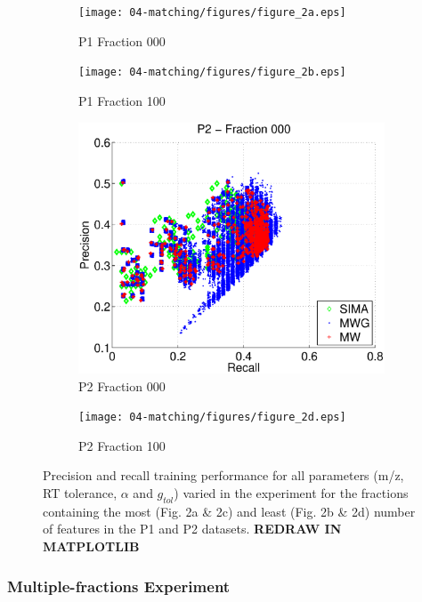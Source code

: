 \begin{figure}[!htbp]
\centering
   \begin{subfigure}{0.24\linewidth} \centering
     \texttt{[image: 04-matching/figures/figure\_2a.eps]}
     \caption{P1 Fraction 000}\label{fig:figA}
   \end{subfigure}
   \begin{subfigure}{0.24\linewidth} \centering
     \texttt{[image: 04-matching/figures/figure\_2b.eps]}
     \caption{P1 Fraction 100}\label{fig:figB}
   \end{subfigure}
   \begin{subfigure}{0.24\linewidth} \centering
     \includegraphics[scale=0.2]{04-matching/figures/figure_2c.eps}
     \caption{P2 Fraction 000}\label{fig:figC}
   \end{subfigure}
   \begin{subfigure}{0.24\linewidth} \centering
     \texttt{[image: 04-matching/figures/figure\_2d.eps]}
     \caption{P2 Fraction 100}\label{fig:figD}
   \end{subfigure}
\caption{Precision and recall training performance for all parameters (m/z, RT tolerance, $\alpha$ and $g_{tol}$) varied in the experiment for the fractions containing the most (Fig. 2a \& 2c) and least (Fig. 2b \& 2d) number of features in the P1 and P2 datasets. \textbf{REDRAW IN MATPLOTLIB}} \label{fig:single-fraction-results}
\end{figure}

\subsubsection{Multiple-fractions Experiment}

